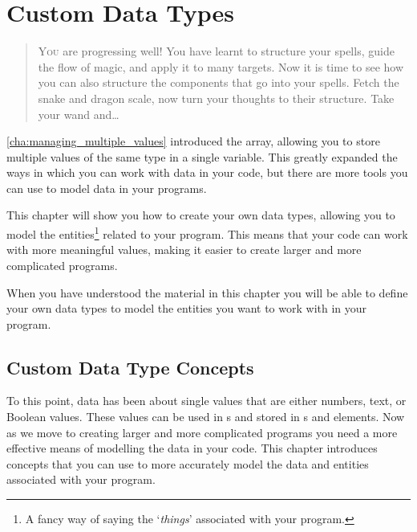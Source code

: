 \chapter{Custom Data Types} %
\label{cha:more_data_types}

\begin{quote}
  \Fontlukas\Large
  \renewcommand{\LettrineTextFont}{\relax}
  \lettrine[image=true,lines=3,lraise=0.1]
  {Y}{ou} are progressing well! You have learnt to structure your spells, guide the flow of magic, and apply it to many targets. Now it is time to see how you can also structure the components that go into your spells. Fetch the snake and dragon scale, now turn your thoughts to their structure. Take your wand and\ldots
\end{quote}

\bigskip


\cref{cha:managing_multiple_values} introduced the array, allowing you to store multiple values of the same type in a single variable. This greatly expanded the ways in which you can work with data in your code, but there are more tools you can use to model data in your programs.

This chapter will show you how to create your own data types, allowing you to model the entities\footnote{A fancy way of saying the `\emph{things}' associated with your program.} related to your program. This means that your code can work with more meaningful values, making it easier to create larger and more complicated programs.

When you have understood the material in this chapter you will be able to define your own data types to model the entities you want to work with in your program.

\minitoc

\clearpage
\section{Custom Data Type Concepts} %
\label{sec:data_type_concepts}

To this point, data has been about single values that are either numbers, text, or Boolean values. These values can be used in s and stored in s and  elements. Now as we move to creating larger and more complicated programs you need a more effective means of modelling the data in your code. This chapter introduces concepts that you can use to more accurately model the data and entities associated with your program.

